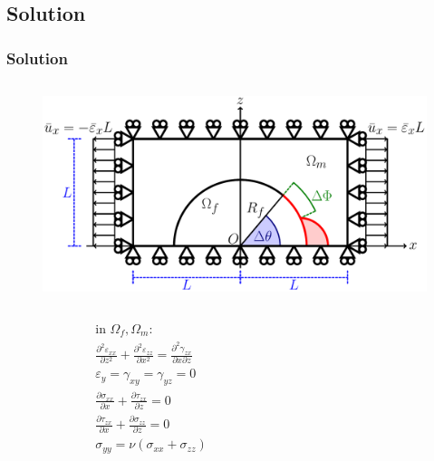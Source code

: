 \documentclass[first,firstsupp,lastsupp,last,hyperref,table]{ETHclass}
\begin{document}
\subsection{Solution}

\begin{frame}
\frametitle{\small Solution}
\vspace{-1.cm}
\centering
\begin{columns}
\begin{column}{0.6\textwidth}
\begin{figure}
\includegraphics[width=0.95\columnwidth]{RUC.pdf}
\end{figure}
\vspace{-0.75cm}
\begin{columns}
\begin{column}{0.3\columnwidth}
\tiny
\begin{equation*}
\begin{aligned}
&\text{in }\Omega_{f}, \Omega_{m}:\\
&\frac{\partial^{2}\varepsilon_{xx}}{\partial z^{2}}+\frac{\partial^{2}\varepsilon_{zz}}{\partial x^{2}}=\frac{\partial^{2}\gamma_{zx}}{\partial x\partial z}\\
&\varepsilon_{y}=\gamma_{xy}=\gamma_{yz}=0\\
&\frac{\partial\sigma_{xx}}{\partial x}+\frac{\partial\tau_{zx}}{\partial z} = 0\\
&\frac{\partial\tau_{zx}}{\partial x}+\frac{\partial\sigma_{zz}}{\partial z} = 0\\
&\sigma_{yy}=\nu\left(\sigma_{xx}+\sigma_{zz}\right)\\
\end{aligned}
\end{equation*}
\end{column}
\begin{column}{0.7\columnwidth}
\tiny
\begin{equation*}
\begin{aligned}

\end{aligned}
\end{equation*}
\end{column}
\end{columns}
\end{column}
\end{columns}
\end{frame}
\end{document}
